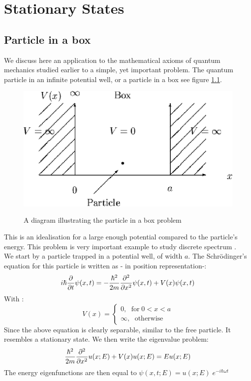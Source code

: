 \chapter{Stationary States}
\section{Particle in a box}
We discuss here an application to the mathematical axioms of quantum mechanics studied earlier to a simple, yet important problem. The quantum particle in an infinite potential well, or a particle in a box see figure \ref{pib}.
\begin{figure}[h!]
	\centering
	\includegraphics[scale =0.3]{./figures/img53}
	\label{pib}
	\caption{ A diagram illustrating the particle in a box problem}
\end{figure}
This is an idealisation for a large enough potential compared to the particle's energy. This problem is very important example to study discrete spectrum .\\
We start by a particle trapped in a potential well, of width $ a$. The Schr\"{o}dinger's equation for this particle is written as - in position representation-:
\begin{equation}
i \hbar \dfrac{\partial}{\partial t}\psi (x,t) =- \frac{\hbar^2}{2m} \dfrac{ \partial^2}{\partial x^2} \psi(x,t) + V(x) \psi(x,t)
\end{equation}
With :
\begin{equation}
V(x) = \begin{cases}
0, \;  \text { for}\;  0<x<a \\
\infty ,\; \text{ otherwise}
\end{cases}
\end{equation}
Since the above equation is clearly separable, similar to the free particle. It resembles a stationary state. We then write the eigenvalue problem:
\begin{equation}
\frac{\hbar^2}{2m} \dfrac{ \partial^2}{\partial x^2} u(x;E) + V(x) u (x;E) = E u(x; E)
\label{eigen}
\end{equation} 
The energy eigenfunctions  are then equal to $ \psi(x,t ;E) = u(x;E) \; e^{-i\hbar \omega t}$
